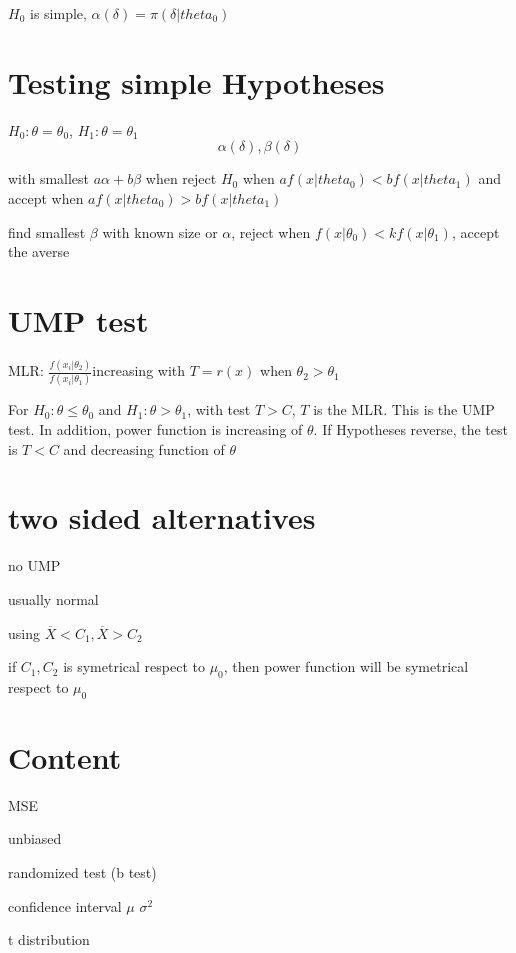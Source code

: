 \documentclass[12pt, a4paper, twocolumn]{article}
\begin{document}
$H_0$ is simple, $\alpha(\delta) = \pi(\delta|theta_0)$

\section*{Testing simple Hypotheses}
$H_0: \theta = \theta_0$, $H_1: \theta = \theta_1$
$$\alpha(\delta), \beta(\delta)$$

with smallest $a\alpha + b\beta$ when reject $H_0$ when $af(x|theta_0) < bf(x|theta_1)$ and accept when $af(x|theta_0) > bf(x|theta_1)$

find smallest $\beta$ with known size or $\alpha$, reject when $f(x|\theta_0) < kf(x|\theta_1)$, accept the averse

\section*{UMP test}
MLR: $\frac{f(x_i|\theta_2)}{f(x_i|\theta_1)}$increasing with $T = r(x)$  when $\theta_2 > \theta_1$

For $H_0: \theta \leqslant \theta_0$ and $H_1: \theta > \theta_1$, with test $T > C$, $T$ is the MLR. This is the UMP test. In addition, power function is increasing of $\theta$. If Hypotheses reverse, the test is $T < C$ and decreasing function of $\theta$

\section*{two sided alternatives}

no UMP

usually normal 

using ${\overline{X} < C_1, \overline{X} > C_2}$

if $C_1, C_2$ is  symetrical respect to $\mu_0$, then power function will be symetrical respect to $\mu_0$






\section*{Content}
MSE 

unbiased 

randomized test (b test)

confidence interval $\mu$ $\sigma^2$

t distribution 
\end{document}
